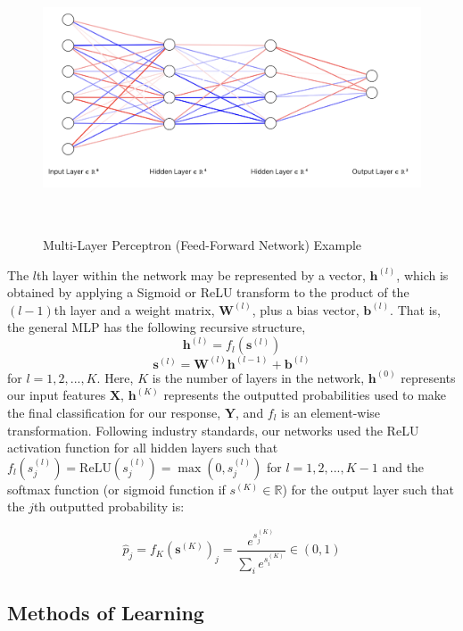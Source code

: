 \documentclass [MAS] {uclathes}
\begin{document}
\begin{figure}[h]
\centering
\includegraphics[height = 80mm, width=145mm]{imgs/ffn.png}
\caption{Multi-Layer Perceptron (Feed-Forward Network) Example}
\label{fig:ffn}
\end{figure}

The $l$th layer within the network may be represented by a vector, $\mathbf{h}^{(l)}$, which is obtained by applying a Sigmoid or ReLU transform to the product of the $(l-1)$th layer and a weight matrix, $\mathbf{W}^{(l)}$, plus a bias vector, $\mathbf{b}^{(l)}$. That is, the general MLP has the following recursive structure, $$\mathbf{h}^{(l)} = f_l(\mathbf{s}^{(l)})$$
$$\mathbf{s}^{(l)} = \mathbf{W}^{(l)}\mathbf{h}^{(l-1)} + \mathbf{b}^{(l)}$$ for $l=1, 2, ..., K$. Here, $K$ is the number of layers in the network, $\mathbf{h}^{(0)}$ represents our input features $\mathbf{X}$, $\mathbf{h}^{(K)}$ represents the outputted probabilities used to make the final classification for our response, $\mathbf{Y}$, and $f_l$ is an element-wise transformation. Following industry standards, our networks used the ReLU activation function for all hidden layers such that $f_l(s^{(l)}_j) = \text{ReLU}(s^{(l)}_j) = \max(0, s^{(l)}_j)$ for $l=1, 2, ..., K-1$ and the softmax function (or sigmoid function if $s^{(K)} \in \mathbb{R}$) for the output layer such that the $j$th outputted probability is:

$$\hat{p}_j = f_K(\mathbf{s}^{(K)})_j = \frac{e^{s^{(K)}_j}}{\sum_i e^{s^{(K)}_i}} \in (0, 1)$$

\subsection{Methods of Learning}
\end{document}
